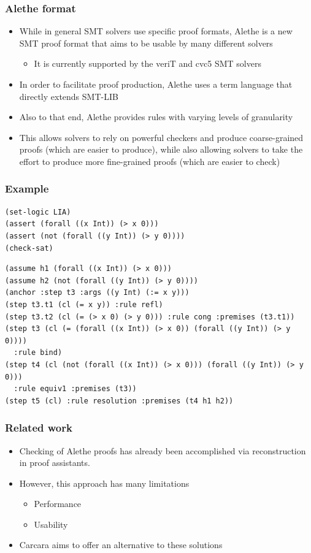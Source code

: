 \documentclass[usepdftitle=false,aspectratio=169]{beamer}
\newcommand\vitem{\vfill\item}
\begin{document}
\begin{frame}
  \frametitle{Alethe format}
  \begin{itemize}
    \vitem While in general SMT solvers use specific proof formats, Alethe is
    a new SMT proof format that aims to be usable by many different solvers
    \begin{itemize}
      \item It is currently supported by the veriT and cvc5 SMT solvers
    \end{itemize}
    \vitem In order to facilitate proof production, Alethe uses a term language
    that directly extends SMT-LIB
    \vitem Also to that end, Alethe provides rules with varying levels of
    granularity
    \vitem This allows solvers to rely on powerful checkers and produce
    coarse-grained proofs (which are easier to produce), while also allowing
    solvers to take the effort to produce more fine-grained proofs (which are
    easier to check)
  \end{itemize}
\end{frame}

\begin{frame}[fragile]
  \frametitle{Example}
  \centering
\begin{verbatim}
(set-logic LIA)
(assert (forall ((x Int)) (> x 0)))
(assert (not (forall ((y Int)) (> y 0))))
(check-sat)
\end{verbatim}
\begin{verbatim}
(assume h1 (forall ((x Int)) (> x 0)))
(assume h2 (not (forall ((y Int)) (> y 0))))
(anchor :step t3 :args ((y Int) (:= x y)))
(step t3.t1 (cl (= x y)) :rule refl)
(step t3.t2 (cl (= (> x 0) (> y 0))) :rule cong :premises (t3.t1))
(step t3 (cl (= (forall ((x Int)) (> x 0)) (forall ((y Int)) (> y 0))))
  :rule bind)
(step t4 (cl (not (forall ((x Int)) (> x 0))) (forall ((y Int)) (> y 0)))
  :rule equiv1 :premises (t3))
(step t5 (cl) :rule resolution :premises (t4 h1 h2))
\end{verbatim}
\end{frame}

\begin{frame}
  \frametitle{Related work}
  \begin{itemize}
    \vitem Checking of Alethe proofs has already been accomplished via
    reconstruction in proof assistants.
    \vitem However, this approach has many limitations
    \begin{itemize}
      \item Performance
      \item Usability
    \end{itemize}
    \vitem Carcara aims to offer an alternative to these solutions
  \end{itemize}
\end{frame}
\end{document}
